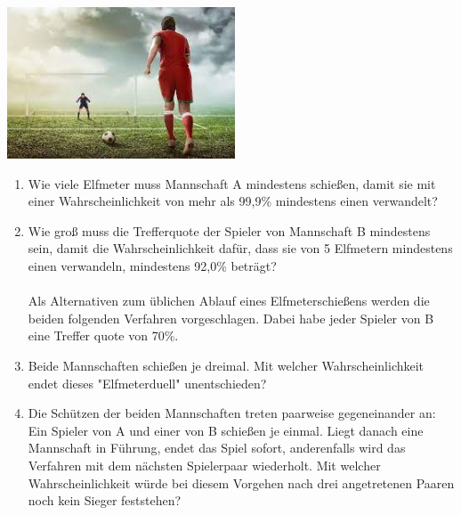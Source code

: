 \documentclass[a4paper,12pt]{article}
\begin{document}
\begin{center}
  {\includegraphics[height=4.5cm]{Q12_1Klausur_Ana_Sto_v2_NachholTermin_01.jpeg}}
\end{center}

\begin{enumerate}[label={\alph*)}] 
  \item Wie viele Elfmeter muss Mannschaft A mindestens schießen, damit sie mit einer Wahrscheinlichkeit von mehr als 99,9\% mindestens einen verwandelt? 
  \item Wie groß muss die Trefferquote der Spieler von Mannschaft B mindestens sein, damit die Wahrscheinlichkeit dafür, dass sie von 5 Elfmetern mindestens einen verwandeln, mindestens 92,0\% beträgt?\\
\\
Als Alternativen zum üblichen Ablauf eines Elfmeterschießens werden die beiden folgenden Verfahren vorgeschlagen. Dabei habe jeder Spieler von B eine Treffer quote von 70\%.

\item Beide Mannschaften schießen je dreimal. Mit welcher Wahrscheinlichkeit endet dieses "Elfmeterduell" unentschieden? 
\item Die Schützen der beiden Mannschaften treten paarweise gegeneinander an: Ein Spieler von A und einer von B schießen je einmal. Liegt danach eine Mannschaft in Führung, endet das Spiel sofort, anderenfalls wird das Verfahren mit dem nächsten Spielerpaar wiederholt. Mit welcher Wahrscheinlichkeit würde bei diesem Vorgehen nach drei angetretenen Paaren noch kein Sieger feststehen?
\end{enumerate}



\end{document}

